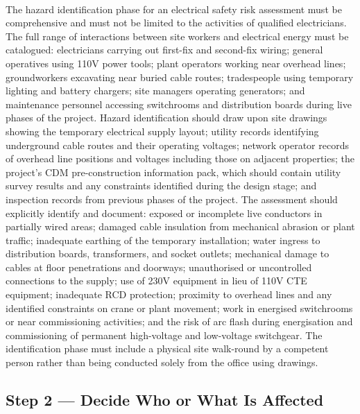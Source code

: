 \paragraph{}
The hazard identification phase for an electrical safety risk assessment must be comprehensive and must not be limited to the activities of qualified electricians. The full range of interactions between site workers and electrical energy must be catalogued: electricians carrying out first-fix and second-fix wiring; general operatives using 110V power tools; plant operators working near overhead lines; groundworkers excavating near buried cable routes; tradespeople using temporary lighting and battery chargers; site managers operating generators; and maintenance personnel accessing switchrooms and distribution boards during live phases of the project. Hazard identification should draw upon site drawings showing the temporary electrical supply layout; utility records identifying underground cable routes and their operating voltages; network operator records of overhead line positions and voltages including those on adjacent properties; the project's CDM pre-construction information pack, which should contain utility survey results and any constraints identified during the design stage; and inspection records from previous phases of the project. The assessment should explicitly identify and document: exposed or incomplete live conductors in partially wired areas; damaged cable insulation from mechanical abrasion or plant traffic; inadequate earthing of the temporary installation; water ingress to distribution boards, transformers, and socket outlets; mechanical damage to cables at floor penetrations and doorways; unauthorised or uncontrolled connections to the supply; use of 230V equipment in lieu of 110V CTE equipment; inadequate RCD protection; proximity to overhead lines and any identified constraints on crane or plant movement; work in energised switchrooms or near commissioning activities; and the risk of arc flash during energisation and commissioning of permanent high-voltage and low-voltage switchgear. The identification phase must include a physical site walk-round by a competent person rather than being conducted solely from the office using drawings.

\subsection{Step 2 --- Decide Who or What Is Affected}

